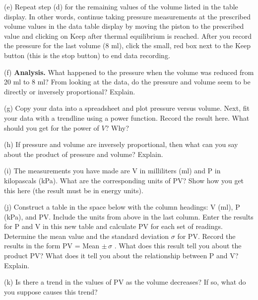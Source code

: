 (e) Repeat step (d) for the remaining values of the volume listed in the table
display. In other words, continue taking pressure measurements at the prescribed
volume values in the data table display by moving the piston to the prescribed
value and clicking on Keep after thermal equilibrium is reached. After you record
the pressure for the last volume (8 ml), click the small, red box next to the
Keep button (this is the stop button) to end data recording.

(f) \textbf{Analysis.} What happened to the pressure when the volume was 
reduced from 20 ml to 8 ml?  From looking at the data, do the pressure and 
volume seem to be directly or inversely proportional? Explain. 
\vspace{25mm}

(g) Copy your data into a spreadsheet and plot pressure versus volume. Next, 
fit your data with a trendline using a power function. Record the result here.
What should you get for the power of $V$? Why?
\vspace{25mm}

(h) If pressure and volume are inversely proportional, then what can you say
about the product of pressure and volume? Explain.
\vspace{35mm}

\newpage

(i) The measurements you have made are V in milliliters (ml) and P in 
kilopascals (kPa). What are the corresponding units of PV? Show how you get 
this here (the result must be in energy units).
\vspace{50mm}

(j) Construct a table in the space below with the column headings: V (ml), P
(kPa), and PV. Include the units from above in the last column.  Enter the 
results for P and V in this new table and calculate
PV for each set of readings. Determine the mean value and the standard deviation
\( \sigma  \) for PV. Record the results in the form PV = Mean \( \pm \, \sigma  \)
. What does this result tell you about the product PV? What does it tell you
about the relationship between P and V? Explain.
\vspace{75mm}

(k) Is there a trend in the values of PV as the volume decreases? If so, what 
do you suppose causes this trend?





